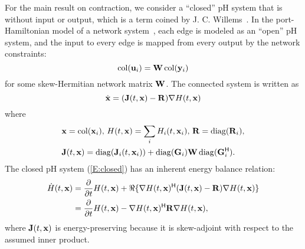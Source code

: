For the main result on contraction, we consider a ``closed'' pH system that is without input or output, which is a term coined by J. C. Willems~\cite{willems2007behavioral}. In the port-Hamiltonian model of a network system~\cite{fiaz2013port}, each edge is modeled as an ``open'' pH system, and the input to every edge is mapped from every output by the network constraints:
\begin{equation*}
    \operatorname*{col}(\mathbf{u}_i) = \mathbf{W} \operatorname*{col}(\mathbf{y}_i)
\end{equation*}
for some skew-Hermitian network matrix $\mathbf{W}$. The connected system is written as
\begin{equation} \label{E:closed}
    \dot{\mathbf{x}} = (\mathbf{J}(t, \mathbf{x}) - \mathbf{R}) \nabla H(t, \mathbf{x})
\end{equation}
where
\begin{align*}
    &\mathbf{x} = \operatorname*{col}(\mathbf{x}_i),\, H(t, \mathbf{x}) = \sum_{i} H_i(t, \mathbf{x}_i),\, \mathbf{R} = \operatorname*{diag}(\mathbf{R}_i), \\
    &\mathbf{J}(t, \mathbf{x}) = \operatorname*{diag}(\mathbf{J}_i(t, \mathbf{x}_i)) + \operatorname*{diag}(\mathbf{G}_i) \mathbf{W} \operatorname*{diag}(\mathbf{G}_i^{\mathsf{H}}).
\end{align*}
The closed pH system (\ref{E:closed}) has an inherent energy balance relation:
\begin{align}
    \dot H(t, \mathbf{x}) &= \frac{\partial}{\partial t}H(t, \mathbf{x}) + \Re\{\nabla H(t, \mathbf{x})^{\mathsf{H}} (\mathbf{J}(t, \mathbf{x}) - \mathbf{R}) \nabla H(t, \mathbf{x}) \} \notag \\
    &= \frac{\partial}{\partial t}H(t, \mathbf{x}) - \nabla H(t, \mathbf{x})^{\mathsf{H}} \mathbf{R} \nabla H(t, \mathbf{x}), \label{E:energy_balance}
\end{align}
where $\mathbf{J}(t, \mathbf{x})$ is energy-preserving because it is skew-adjoint with respect to the assumed inner product.




